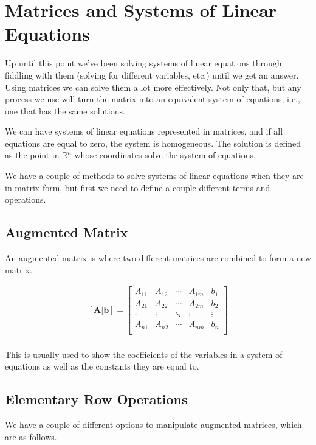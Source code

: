 \section{Matrices and Systems of Linear Equations}
Up until this point we've been solving systems of linear equations through fiddling with them (solving for different variables, etc.) until we get an answer. Using matrices we can solve them a lot more effectively. Not only that, but any process we use will turn the matrix into an equivalent system of equations, i.e., one that has the same solutions.

We can have systems of linear equations represented in matrices, and if all equations are equal to zero, the system is homogeneous. The solution is defined as the point in $\mathbb{R}^n$ whose coordinates solve the system of equations.

We have a couple of methods to solve systems of linear equations when they are in matrix form, but first we need to define a couple different terms and operations.

    \subsection{Augmented Matrix}
    An augmented matrix is where two different matrices are combined to form a new matrix.

    \begin{equation}\label{eq:augmented_matrix}
    \begin{aligned}
        \mathbf{[A|b]}=
        \left[\begin{array}{cccc|c}
        A_{11} & A_{12} & \cdots & A_{1m} & b_1\\
        A_{21} & A_{22} & \cdots & A_{2m} & b_2\\
        \vdots & \vdots & \ddots & \vdots & \vdots\\
        A_{n1} & A_{n2} & \cdots & A_{nm} & b_n\\
        \end{array}\right]\\
    \end{aligned}
    \end{equation}

    This is usually used to show the coefficients of the variables in a system of equations as well as the constants they are equal to.

    \subsection{Elementary Row Operations}
    We have a couple of different options to manipulate augmented matrices, which are as follows.

